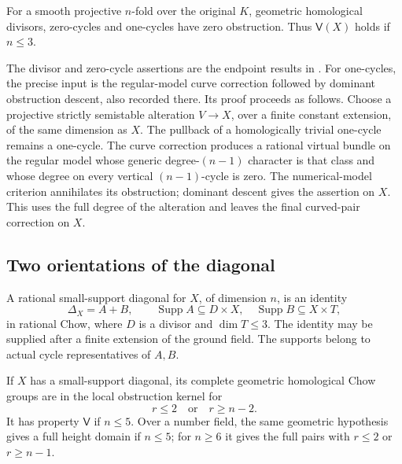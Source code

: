 \begin{proposition}\label{prop:endpoint-input}
For a smooth projective $n$-fold over the original $K$, geometric
homological divisors, zero-cycles and one-cycles have zero obstruction.
Thus $\mathsf V(X)$ holds if $n\leq3$.
\end{proposition}

The divisor and zero-cycle assertions are the endpoint results in
\cite{InternalEndpoints}. For one-cycles, the precise input is the
regular-model curve correction followed by dominant obstruction
descent, also recorded there. Its proof proceeds as follows. Choose a
projective strictly semistable alteration $V\to X$, over a finite
constant extension, of the same dimension as $X$. The pullback of a
homologically trivial one-cycle remains a one-cycle. The curve
correction produces a rational virtual bundle on the regular model
whose generic degree-$(n-1)$ character is that class and whose degree
on every vertical $(n-1)$-cycle is zero. The numerical-model criterion
annihilates its obstruction; dominant descent gives the assertion on
$X$. This uses the full degree of the alteration and leaves the final
curved-pair correction on $X$.

\subsection{Two orientations of the diagonal}

\begin{definition}\label{def:small-support}
A rational small-support diagonal for $X$, of dimension $n$, is an
identity
\begin{equation}\label{eq:small-diagonal}
 \Delta_X=A+B,\qquad
 \operatorname{Supp}A\subseteq D\times X,\quad
 \operatorname{Supp}B\subseteq X\times T,
\end{equation}
in rational Chow, where $D$ is a divisor and $\dim T\leq3$.
The identity may be supplied after a finite extension of the ground
field. The supports belong to actual cycle representatives of $A,B$.
\end{definition}

\begin{theorem}\label{thm:small-support}
If $X$ has a small-support diagonal, its complete geometric homological
Chow groups are in the local obstruction kernel for
\begin{equation}\label{eq:small-support-range}
 r\leq2\quad\text{or}\quad r\geq n-2.
\end{equation}
It has property $\mathsf V$ if $n\leq5$. Over a number field, the
same geometric hypothesis gives a full height domain if $n\leq5$;
for $n\geq6$ it gives the full pairs with $r\leq2$ or $r\geq n-1$.
\end{theorem}

